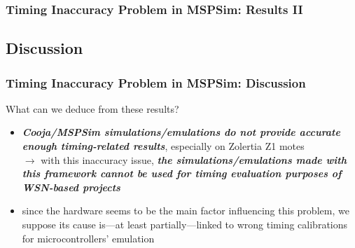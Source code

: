 \documentclass[10pt,c]{beamer}
\renewcommand{\emph}[1]{\textbf{\textit{#1}}}
\begin{document}
\begin{frame}
\frametitle{Timing Inaccuracy Problem in MSPSim: Results II}
\end{frame}

\subsection{Discussion}

\begin{frame}
\frametitle{Timing Inaccuracy Problem in MSPSim: Discussion}
\begin{alertblock}{What can we deduce from these results?}
\begin{itemize}
\item \emph{Cooja/MSPSim simulations/emulations do not provide accurate
enough timing-related results}, especially on Zolertia Z1 motes \\
$\rightarrow$ with this inaccuracy issue, \emph{the simulations/emulations
made with this framework cannot be used for timing evaluation purposes
of WSN-based projects}
\item since the hardware seems to be the main factor influencing this
problem, we suppose its cause is---at least partially---linked to wrong
timing calibrations for microcontrollers' emulation 
\end{itemize}
\end{alertblock}
\end{frame}
\end{document}
